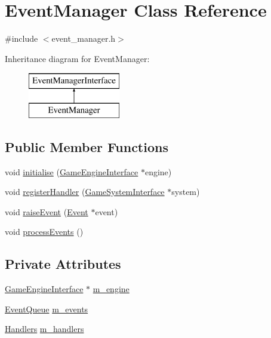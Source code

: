\hypertarget{classEventManager}{\section{Event\-Manager Class Reference}
\label{classEventManager}
}


{\ttfamily \#include $<$event\-\_\-manager.\-h$>$}

Inheritance diagram for Event\-Manager\-:\begin{figure}[H]
\begin{center}
\leavevmode
\includegraphics[height=2.000000cm]{classEventManager}
\end{center}
\end{figure}
\subsection*{Public Member Functions}
\begin{DoxyCompactItemize}
\item 
void \hyperlink{classEventManager_a93b64a8bc38a9842d10ee1526016671f}{initialise} (\hyperlink{classGameEngineInterface}{Game\-Engine\-Interface} $\ast$engine)
\item 
void \hyperlink{classEventManager_ae7c1bd23bc1beafa64b748553b471dce}{register\-Handler} (\hyperlink{classGameSystemInterface}{Game\-System\-Interface} $\ast$system)
\item 
void \hyperlink{classEventManager_abce64060a5fb8cc3d51803b0d43f222f}{raise\-Event} (\hyperlink{classEvent}{Event} $\ast$event)
\item 
void \hyperlink{classEventManager_ad40f65674444d1944159dd85888740d3}{process\-Events} ()
\end{DoxyCompactItemize}
\subsection*{Private Attributes}
\begin{DoxyCompactItemize}
\item 
\hyperlink{classGameEngineInterface}{Game\-Engine\-Interface} $\ast$ \hyperlink{classEventManager_ab26aa30e5a4ceb6f8c604b81991e7c39}{m\-\_\-engine}
\item 
\hyperlink{event__manager_8h_aa72a6ddd7c2b54a7df7b25928521b296}{Event\-Queue} \hyperlink{classEventManager_abc0dbcdc9126d867671acb49c48f6d36}{m\-\_\-events}
\item 
\hyperlink{event__manager_8h_a4d71a6d029a74348b1e4fbdc42f7acbd}{Handlers} \hyperlink{classEventManager_a0d6a8d7439edfb5e23402437ea0f1c4c}{m\-\_\-handlers}
\end{DoxyCompactItemize}


